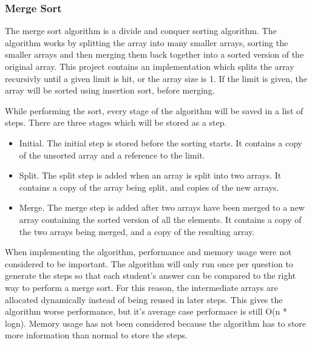 \subsubsection{Merge Sort}
The merge sort algorithm is a divide and conquer sorting algorithm. The algorithm works by splitting the array into many smaller arrays, sorting the smaller arrays and then merging them back together into a sorted version of the original array. This project contains an implementation which splits the array recursivly until a given limit is hit, or the array size is 1. If the limit is given, the array will be sorted using insertion sort, before merging.
\par
While performing the sort, every stage of the algorithm will be saved in a list of steps. There are three stages which will be stored as a step.
\begin{itemize}
    \item Initial. The initial step is stored before the sorting starts. It contains a copy of the unsorted array and a reference to the limit.
    \item Split. The split step is added when an array is split into two arrays. It contains a copy of the array being split, and copies of the new arrays.
    \item Merge. The merge step is added after two arrays have been merged to a new array containing the sorted version of all the elements. It contains a copy of the two arrays being merged, and a copy of the resulting array.
\end{itemize}
\par
When implementing the algorithm, performance and memory usage were not considered to be important. The algorithm will only run once per question to generate the steps so that each student's answer can be compared to the right way to perform a merge sort. For this reason, the intermediate arrays are allocated dynamically instead of being reused in later steps. This gives the algorithm worse performance, but it's average case performace is still O(n * logn). Memory usage has not been considered because the algorithm has to store more information than normal to store the steps.